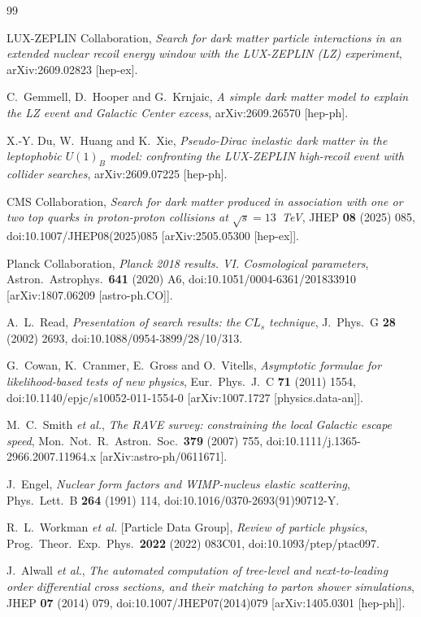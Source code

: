 \begin{thebibliography}{99}\small

 LUX-ZEPLIN Collaboration, \emph{Search for dark matter particle interactions in an extended nuclear recoil energy window with the LUX-ZEPLIN (LZ) experiment}, arXiv:2609.02823 [hep-ex].

 C.~Gemmell, D.~Hooper and G.~Krnjaic, \emph{A simple dark matter model to explain the LZ event and Galactic Center excess}, arXiv:2609.26570 [hep-ph].

 X.-Y. Du, W.~Huang and K.~Xie, \emph{Pseudo-Dirac inelastic dark matter in the leptophobic $U(1)_B$ model: confronting the LUX-ZEPLIN high-recoil event with collider searches}, arXiv:2609.07225 [hep-ph].

 CMS Collaboration, \emph{Search for dark matter produced in association with one or two top quarks in proton-proton collisions at $\sqrt{s}=13$~TeV}, JHEP \textbf{08} (2025) 085, doi:10.1007/JHEP08(2025)085 [arXiv:2505.05300 [hep-ex]].

 Planck Collaboration, \emph{Planck 2018 results. VI. Cosmological parameters}, Astron.\ Astrophys.\ \textbf{641} (2020) A6, doi:10.1051/0004-6361/201833910 [arXiv:1807.06209 [astro-ph.CO]].

 A.~L.~Read, \emph{Presentation of search results: the $CL_s$ technique}, J.\ Phys.\ G \textbf{28} (2002) 2693, doi:10.1088/0954-3899/28/10/313.

 G.~Cowan, K.~Cranmer, E.~Gross and O.~Vitells, \emph{Asymptotic formulae for likelihood-based tests of new physics}, Eur.\ Phys.\ J.\ C \textbf{71} (2011) 1554, doi:10.1140/epjc/s10052-011-1554-0 [arXiv:1007.1727 [physics.data-an]].

 M.~C.~Smith \emph{et al.}, \emph{The RAVE survey: constraining the local Galactic escape speed}, Mon.\ Not.\ R.\ Astron.\ Soc.\ \textbf{379} (2007) 755, doi:10.1111/j.1365-2966.2007.11964.x [arXiv:astro-ph/0611671].

 J.~Engel, \emph{Nuclear form factors and WIMP-nucleus elastic scattering}, Phys.\ Lett.\ B \textbf{264} (1991) 114, doi:10.1016/0370-2693(91)90712-Y.

 R.~L.~Workman \emph{et al.} [Particle Data Group], \emph{Review of particle physics}, Prog.\ Theor.\ Exp.\ Phys.\ \textbf{2022} (2022) 083C01, doi:10.1093/ptep/ptac097.

 J.~Alwall \emph{et al.}, \emph{The automated computation of tree-level and next-to-leading order differential cross sections, and their matching to parton shower simulations}, JHEP \textbf{07} (2014) 079, doi:10.1007/JHEP07(2014)079 [arXiv:1405.0301 [hep-ph]].


\end{thebibliography}

